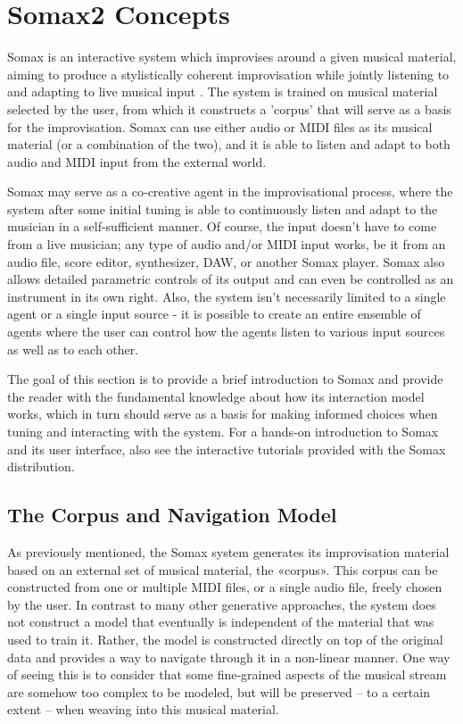 \chapter{Somax2 Concepts}\label{sec:concepts}

Somax is an interactive system which improvises around a given musical material, aiming to produce a stylistically coherent improvisation while jointly listening to and adapting to live musical input . The system is trained on  musical material selected by the user, from which it constructs a 'corpus' that will serve as a basis for the improvisation. Somax can use either audio or MIDI files as its musical material (or a combination of the two), and it is able to listen and adapt to both audio and MIDI input from the external world. 

Somax may serve as a co-creative agent in the improvisational process, where the system after some initial tuning is able to continuously listen and adapt to the musician in a self-sufficient manner. Of course, the input doesn't have to come from a live musician; any type of audio and/or MIDI input works, be it from an audio file, score editor, synthesizer, DAW, or another Somax player. Somax also allows detailed parametric controls of its output and can even be controlled as an instrument in its own right. Also, the system isn't necessarily limited to a single agent or a single input source - it is possible to create an entire ensemble of agents where the user can control how the agents listen to various input sources as well as to each other.

The goal of this section is to provide a brief introduction to Somax and provide the reader with the fundamental knowledge about how its interaction model works, which in turn should serve as a basis for making informed choices when tuning and interacting with the system. For a hands-on introduction to Somax and its user interface, also see the interactive tutorials provided with the Somax distribution.

\section{The Corpus and Navigation Model}
As previously mentioned, the Somax system generates its improvisation material based on an external set of musical material, the «corpus». This corpus can be constructed from one or multiple MIDI files, or a single audio file, freely chosen by the user. In contrast to many other generative approaches, the system does not construct a model that eventually is independent of the material that was used to train it. Rather, the model is constructed directly on top of the original data and provides a way to navigate through it in a non-linear manner. One way of seeing this is to consider that some fine-grained aspects of the musical stream are somehow too complex to be modeled, but will be preserved – to a certain extent – when weaving into this musical material.

